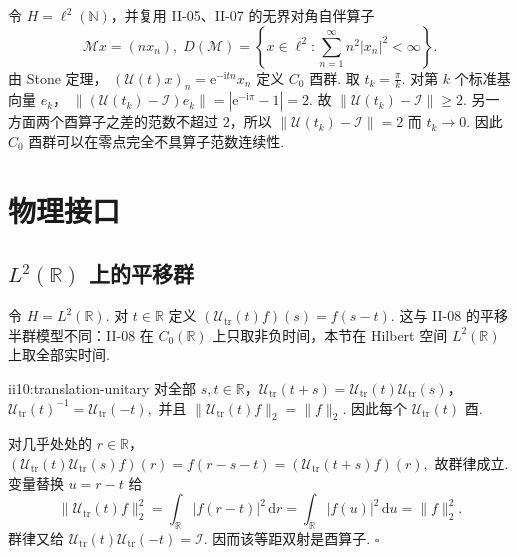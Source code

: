 \begin{FAWarning}[强连续不要求算子范数连续]
令 \(\displaystyle H=\ell^2(\mathbb N)\)，并复用 II-05、II-07 的无界对角自伴算子
\[
\mathcal Mx=(nx_n),
\;
D(\mathcal M)=\left\{x\in\ell^2:\sum_{n=1}^{\infty}n^2|x_n|^2<\infty\right\}.
\]
由 Stone 定理， \(\displaystyle (\mathcal U(t)x)_n = \mathrm{e}^{-\mathrm{i}tn}x_n\)
定义 \(\displaystyle C_0\) 酉群. 取 \(\displaystyle t_k=\frac{\pi}{k}\). 对第 \(\displaystyle k\) 个标准基向量 \(\displaystyle e_k\)， \(\displaystyle \|(\mathcal U(t_k)-\mathcal I)e_k\| = |\mathrm{e}^{-\mathrm{i}\pi}-1| = 2.\)
故 \(\displaystyle\|\mathcal U(t_k)-\mathcal I\|\geqslant2\). 另一方面两个酉算子之差的范数不超过 \(\displaystyle2\)，所以 \(\displaystyle \|\mathcal U(t_k)-\mathcal I\|=2\)
而 \(\displaystyle t_k\to0\). 因此 \(\displaystyle C_0\) 酉群可以在零点完全不具算子范数连续性.
\end{FAWarning}

\section{物理接口}\label{sec:ii10-physics-interface}

\subsection{\texorpdfstring{\(\displaystyle L^2(\mathbb R)\)}{L2R} 上的平移群}

令 \(\displaystyle H=L^2(\mathbb R)\). 对 \(\displaystyle t\in\mathbb R\) 定义 \(\displaystyle (\mathcal U_{\mathrm{tr}}(t)f)(s)=f(s-t).\)
这与 II-08 的平移半群模型不同：II-08 在 \(\displaystyle C_0(\mathbb R)\) 上只取非负时间，本节在 Hilbert 空间 \(\displaystyle L^2(\mathbb R)\) 上取全部实时间.

\begin{FAProposition}[B][平移算子族为酉群]{ii10:translation-unitary}
对全部 \(\displaystyle s,t\in\mathbb R\)，\(\displaystyle \mathcal U_{\mathrm{tr}}(t+s)=\mathcal U_{\mathrm{tr}}(t)\mathcal U_{\mathrm{tr}}(s)\)，\(\displaystyle \mathcal U_{\mathrm{tr}}(t)^{-1} = \mathcal U_{\mathrm{tr}}(-t),\)
并且 \(\displaystyle \|\mathcal U_{\mathrm{tr}}(t)f\|_2=\|f\|_2.\)
因此每个 \(\displaystyle\mathcal U_{\mathrm{tr}}(t)\) 酉.
\end{FAProposition}

\begin{FAProof}
对几乎处处的 \(\displaystyle r\in\mathbb R\)， \(\displaystyle (\mathcal U_{\mathrm{tr}}(t)\mathcal U_{\mathrm{tr}}(s)f)(r) =f(r-s-t) =(\mathcal U_{\mathrm{tr}}(t+s)f)(r),\)
故群律成立. 变量替换 \(\displaystyle u=r-t\) 给
\[
\|\mathcal U_{\mathrm{tr}}(t)f\|_2^2
=
\int_{\mathbb R}|f(r-t)|^2\,\mathrm{d}r
=
\int_{\mathbb R}|f(u)|^2\,\mathrm{d}u
=
\|f\|_2^2.
\]
群律又给 \(\displaystyle\mathcal U_{\mathrm{tr}}(t)\mathcal U_{\mathrm{tr}}(-t)=\mathcal I\). 因而该等距双射是酉算子.
\hfill\(\square\)
\end{FAProof}

